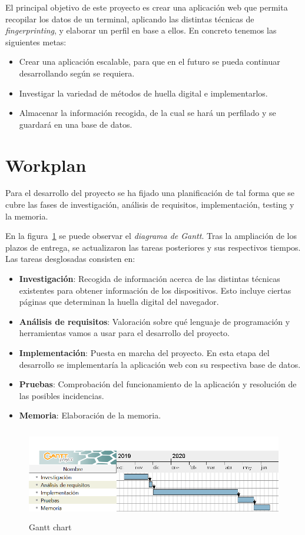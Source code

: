 El principal objetivo de este proyecto es crear una aplicación web que permita recopilar los datos de un terminal, aplicando las distintas técnicas de \textit{fingerprinting}, y elaborar un perfil en base a ellos. En concreto tenemos las siguientes metas:
\begin{itemize}
    \item Crear una aplicación escalable, para que en el futuro se pueda continuar desarrollando según se requiera.
    \item Investigar la variedad de métodos de huella digital e implementarlos.
    \item Almacenar la información recogida, de la cual se hará un perfilado y se guardará en una base de datos.
\end{itemize}

\section{Workplan}
Para el desarrollo del proyecto se ha fijado una planificación de tal forma que se cubre las fases de investigación, análisis de requisitos, implementación, testing y la memoria.\par
En la figura~\ref{fig:diagramaGantt} se puede observar el \textit{diagrama de Gantt}. Tras la ampliación de los plazos de entrega, se actualizaron las tareas posteriores y sus respectivos tiempos. Las tareas desglosadas consisten en:
\begin{itemize}
    \item \textbf{Investigación}: Recogida de información acerca de las distintas técnicas existentes\cite{Huella} para obtener información de los dispositivos. Esto incluye ciertas páginas que determinan la huella digital del navegador\cite{amiunique}.
    \item \textbf{Análisis de requisitos}: Valoración sobre qué lenguaje de programación y herramientas vamos a usar para el desarrollo del proyecto.
    \item \textbf{Implementación}: Puesta en marcha del proyecto. En esta etapa del desarrollo se implementaría la aplicación web con su respectiva base de datos.
    \item \textbf{Pruebas}: Comprobación del funcionamiento de la aplicación y resolución de las posibles incidencias.
    \item \textbf{Memoria}: Elaboración de la memoria.
\end{itemize}
\begin{figure}[b]
	\includegraphics[width=1\textwidth, height=4cm]{Images/diagramaGantt.png}
	\caption{Gantt chart}
	\label{fig:diagramaGantt}
\end{figure}